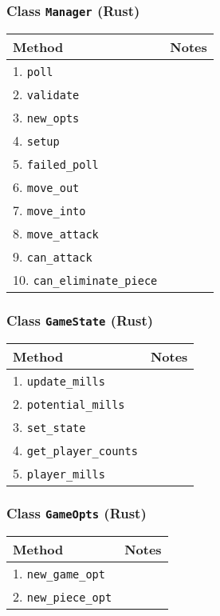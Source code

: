 \documentclass[11pt]{article}
\begin{document}
\subsubsection{Class \texttt{Manager} (Rust)}
\label{sec:org6686cf5}
\begin{center}
\begin{tabular}{|l|l|}
Method & Notes\\
\hline
1. \texttt{poll} & \\
2. \texttt{validate} & \\
3. \texttt{new\_opts} & \\
4. \texttt{setup} & \\
5. \texttt{failed\_poll} & \\
6. \texttt{move\_out} & \\
7. \texttt{move\_into} & \\
8. \texttt{move\_attack} & \\
9. \texttt{can\_attack} & \\
10. \texttt{can\_eliminate\_piece} & \\
\end{tabular}
\end{center}

\subsubsection{Class \texttt{GameState} (Rust)}
\label{sec:org5e39a77}
\begin{center}
\begin{tabular}{|l|l|}
Method & Notes\\
\hline
1. \texttt{update\_mills} & \\
2. \texttt{potential\_mills} & \\
3. \texttt{set\_state} & \\
4. \texttt{get\_player\_counts} & \\
5. \texttt{player\_mills} & \\
\end{tabular}
\end{center}

\subsubsection{Class \texttt{GameOpts} (Rust)}
\label{sec:orgcc442a0}
\begin{center}
\begin{tabular}{|l|l|}
Method & Notes\\
\hline
1. \texttt{new\_game\_opt} & \\
2. \texttt{new\_piece\_opt} & \\
\end{tabular}
\end{center}
\end{document}

